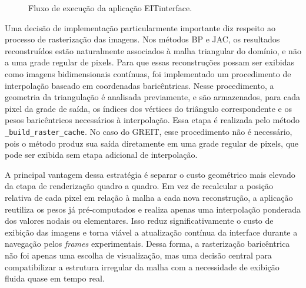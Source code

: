 \begin{figure}[H]
\caption{Fluxo de execução da aplicação EITinterface.}
\label{fig:fluxo_execucao}
\end{figure}

Uma decisão de implementação particularmente importante diz respeito ao processo de rasterização das imagens. Nos métodos BP e JAC, os resultados reconstruídos estão naturalmente associados à malha triangular do domínio, e não a uma grade regular de pixels. Para que essas reconstruções possam ser exibidas como imagens bidimensionais contínuas, foi implementado um procedimento de interpolação baseado em coordenadas baricêntricas. Nesse procedimento, a geometria da triangulação é analisada previamente, e são armazenados, para cada pixel da grade de saída, os índices dos vértices do triângulo correspondente e os pesos baricêntricos necessários à interpolação. Essa etapa é realizada pelo método \texttt{\_build\_raster\_cache}. No caso do GREIT, esse procedimento não é necessário, pois o método produz sua saída diretamente em uma grade regular de pixels, que pode ser exibida sem etapa adicional de interpolação.

A principal vantagem dessa estratégia é separar o custo geométrico mais elevado da etapa de renderização quadro a quadro. Em vez de recalcular a posição relativa de cada pixel em relação à malha a cada nova reconstrução, a aplicação reutiliza os pesos já pré-computados e realiza apenas uma interpolação ponderada dos valores nodais ou elementares. Isso reduz significativamente o custo de exibição das imagens e torna viável a atualização contínua da interface durante a navegação pelos \textit{frames} experimentais. Dessa forma, a rasterização baricêntrica não foi apenas uma escolha de visualização, mas uma decisão central para compatibilizar a estrutura irregular da malha com a necessidade de exibição fluida quase em tempo real.


